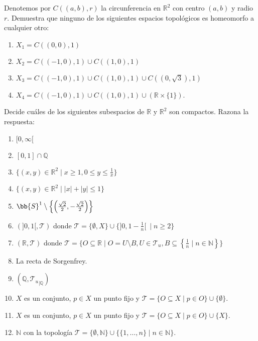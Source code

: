 \begin{ejercicio}
Denotemos por \( C((a, b), r) \) la circunferencia en \( \mathbb{R}^2 \) con centro \((a, b)\) y radio \(r\). Demuestra que ninguno de los siguientes espacios topológicos es homeomorfo a cualquier otro:
\begin{enumerate}
    \item \( X_1 = C((0, 0), 1) \)
    \item \( X_2 = C((-1, 0), 1) \cup C((1, 0), 1) \)
    \item \( X_3 = C((-1, 0), 1) \cup C((1, 0), 1) \cup C((0, \sqrt{3}), 1) \)
    \item \( X_4 = C((-1, 0), 1) \cup C((1, 0), 1) \cup (\mathbb{R} \times \{1\}) \).
\end{enumerate}
\end{ejercicio}

\begin{ejercicio}
Decide cuáles de los siguientes subespacios de \( \mathbb{R} \) y \( \mathbb{R}^2 \) son compactos. Razona la respuesta:
\begin{enumerate}
    \item \( [0, \infty[ \)
    \item \( [0, 1] \cap \mathbb{Q} \)
    \item \( \{(x, y) \in \mathbb{R}^2 \mid x \geq 1, 0 \leq y \leq \frac{1}{x}\} \)
    \item \( \{(x, y) \in \mathbb{R}^2 \mid |x| + |y| \leq 1\} \)
    \item \( \bb{S}^1 \setminus \left\{\left(\frac{\sqrt{2}}{2}, -\frac{\sqrt{2}}{2}\right)\right\} \)
    \item \( (]0, 1[, \mathcal{T}) \) donde \( \mathcal{T} = \{\emptyset, X\} \cup \{]0, 1 - \frac{1}{n}[~\mid n \geq 2\} \)
    \item \( (\mathbb{R}, \mathcal{T}) \) donde \( \mathcal{T} = \{O \subseteq \mathbb{R} \mid O = U \setminus B, U \in \mathcal{T}_u, B \subseteq \left\{\frac{1}{n} \mid n \in \mathbb{N}\right\}\} \)
    \item La recta de Sorgenfrey.
    \item \( (\mathbb{Q}, {\mathcal{T}_u}_{\big |\mathbb{Q}}) \)
    \item \( X \) es un conjunto, \( p \in X \) un punto fijo y \( \mathcal{T} = \{O \subseteq X \mid p \in O\} \cup \{\emptyset\} \).
    \item \( X \) es un conjunto, \( p \in X \) un punto fijo y \( \mathcal{T} = \{O \subseteq X \mid p \in O\} \cup \{X\} \).
    \item \( \mathbb{N} \) con la topología \( \mathcal{T} = \{\emptyset, \mathbb{N}\} \cup \{\{1, \ldots, n\} \mid n \in \mathbb{N}\} \).
\end{enumerate}
\end{ejercicio}

